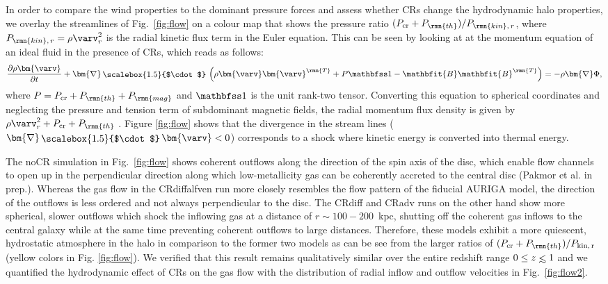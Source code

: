 \documentclass[useAMS,usenatbib]{mnras}
\def\lesssim{\mathrel{\hbox{\rlap{\hbox{\lower4pt\hbox{$\sim$}}}\hbox{$<$}}}}
\newcommand{\mat}{\ensuremath{\mathbfss}}
\newcommand{\bnabla}{\bm{\nabla}}
\newcommand{\CR}{\mathrm{cr}}
\newcommand{\bvel}{\ensuremath{\bm{\varv}}}
\newcommand{\bB}{\ensuremath{\mathbfit{B}}}
\newcommand{\bcdot}{\ensuremath{\mathchoice {\mskip\thinmuskip\lower0.2ex\hbox{\scalebox{1.5}{$\cdot$}}\mskip\thinmuskip}}{\mskip\thinmuskip\lower0.2ex\hbox{\scalebox{1.5}{$\cdot$}}\mskip\thinmuskip}{\lower0.3ex\hbox{\scalebox{1.2}{$\cdot$}}}{\lower0.3ex\hbox{\scalebox{1.2}{$\cdot$}}}}
\begin{document}
In order to compare the wind properties to the dominant pressure forces and assess whether CRs change the hydrodynamic halo properties, we overlay the streamlines of Fig.\ \ref{fig:flow} on a colour map that shows the pressure ratio $(P_\CR + P_\rmn{th})/P_{\rmn{kin},\,r}$, where $P_{\rmn{kin},\,r}=\rho \varv_r^2$ is the radial kinetic flux term in the Euler equation. This can be seen by looking at at the momentum equation of an ideal fluid in the presence of CRs, which reads as follows:
\begin{equation}
  \frac{\partial \rho \bvel}{\partial t}
  + \bnabla\bcdot \left(\rho \bvel \bvel^\rmn{T} + P\mat{1} - \bB\bB^\rmn{T}\right)
  = -\rho\bnabla\Phi,
  \label{eq:euler}
\end{equation}
where $P=P_\CR + P_{\rmn{th}} + P_\rmn{mag}$ and $\mat{1}$ is the unit rank-two tensor. Converting this equation to spherical coordinates and neglecting the pressure and tension term of subdominant magnetic fields, the radial momentum flux density is given by $\rho \varv_r^2 + P_\CR + P_{\rmn{th}}$ \citep{Mihalas1984}. Figure \ref{fig:flow} shows that the divergence in the stream lines ($\bnabla \bcdot\bvel < 0$) corresponds to a shock where kinetic energy is converted into thermal energy.

The noCR simulation in Fig.\ \ref{fig:flow} shows coherent outflows along the direction of the spin axis of the disc, which enable flow channels to open up in the perpendicular direction along which low-metallicity gas can be coherently accreted to the central disc (Pakmor et al. in prep.). Whereas the gas flow in the CRdiffalfven run more closely resembles the flow pattern of the fiducial AURIGA model, the direction of the outflows is less ordered and not always perpendicular to the disc. The CRdiff and CRadv runs on the other hand show more spherical, slower outflows which shock the inflowing gas at a distance of $r\sim100-200$~kpc, shutting off the coherent gas inflows to the central galaxy while at the same time preventing coherent outflows to large distances. Therefore, these models exhibit a more quiescent, hydrostatic atmosphere in the halo in comparison to the former two models as can be see from the larger ratios of $(P_\CR + P_{\rmn{th}})/P_{\rm{kin,}\, r}$ (yellow colors in Fig. \ref{fig:flow}). We verified that this result remains qualitatively similar over the entire redshift range $0\leq z\lesssim1$ and we quantified the hydrodynamic effect of CRs on the gas flow with the distribution of radial inflow and outflow velocities in Fig.\ \ref{fig:flow2}.
\end{document}

